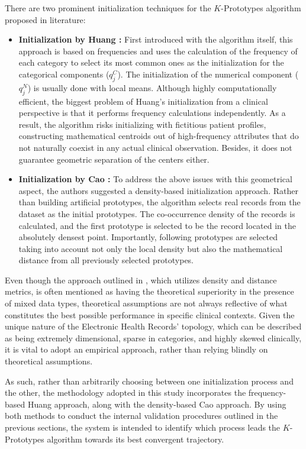 \vspace{1em}

There are two prominent initialization techniques for the $K$-Prototypes algorithm proposed in literature:

\begin{itemize}
    \item \textbf{Initialization by Huang \cite{huang1998}:} First introduced with the algorithm itself, this approach is based on frequencies and uses the calculation of the frequency of each category to select its most common ones as the initialization for the categorical components ($q_j^C$). The initialization of the numerical component ($q_j^N$) is usually done with local means. Although highly computationally efficient, the biggest problem of Huang's initialization from a clinical perspective is that it performs frequency calculations independently. As a result, the algorithm risks initializing with fictitious patient profiles, constructing mathematical centroids out of high-frequency attributes that do not naturally coexist in any actual clinical observation. Besides, it does not guarantee geometric separation of the centers either.

    \item \textbf{Initialization by Cao \cite{cao2009}:} To address the above issues with this geometrical aspect, the authors suggested a density-based initialization approach. Rather than building artificial prototypes, the algorithm selects real records from the dataset as the initial prototypes. The co-occurrence density of the records is calculated, and the first prototype is selected to be the record located in the absolutely densest point. Importantly, following prototypes are selected taking into account not only the local density but also the mathematical distance from all previously selected prototypes.
\end{itemize}

\vspace{1em}

Even though the approach outlined in \cite{cao2009}, which utilizes density and distance metrics, is often mentioned as having the theoretical superiority in the presence of mixed data types, theoretical assumptions are not always reflective of what constitutes the best possible performance in specific clinical contexts. Given the unique nature of the Electronic Health Records' topology, which can be described as being extremely dimensional, sparse in categories, and highly skewed clinically, it is vital to adopt an empirical approach, rather than relying blindly on theoretical assumptions.

As such, rather than arbitrarily choosing between one initialization process and the other, the methodology adopted in this study incorporates the frequency-based Huang approach, along with the density-based Cao approach. By using both methods to conduct the internal validation procedures outlined in the previous sections, the system is intended to identify which process leads the $K$-Prototypes algorithm towards its best convergent trajectory.

